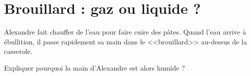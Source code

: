 \section{Brouillard : gaz ou liquide ?}

Alexandre fait chauffer de l'eau pour faire cuire des pâtes. Quand l'eau arrive à ébullition, il passe rapidement sa main dans le <<brouillard>> au-dessus de la casserole.

Expliquer pourquoi la main d'Alexandre est alors humide ?